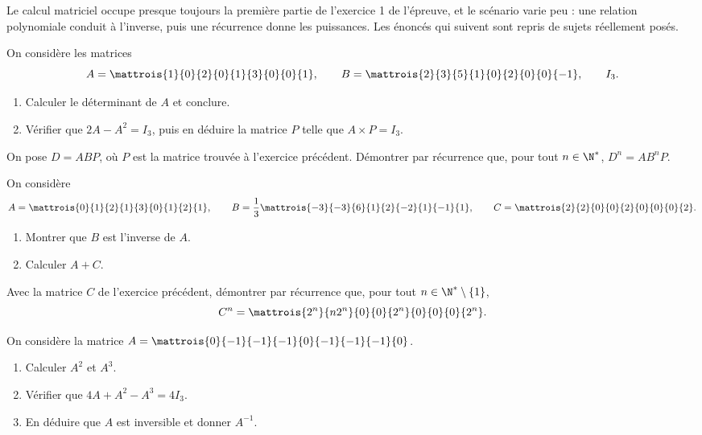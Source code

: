\begin{annales}
Le calcul matriciel occupe presque toujours la première partie de l'exercice 1
de l'épreuve, et le scénario varie peu : une relation polynomiale conduit à
l'inverse, puis une récurrence donne les puissances. Les énoncés qui suivent
sont repris de sujets réellement posés.

On considère les matrices
\[
  A = \mattrois{1}{0}{2}{0}{1}{3}{0}{0}{1}, \qquad
  B = \mattrois{2}{3}{5}{1}{0}{2}{0}{0}{-1}, \qquad I_{3}.
\]
\begin{enumerate}[label=\textbf{\arabic*)}, leftmargin=*, itemsep=0.15em]
  \item Calculer le déterminant de $A$ et conclure.
  \item Vérifier que $2A-A^{2} = I_{3}$, puis en déduire la matrice $P$ telle
        que $A \times P = I_{3}$.
\end{enumerate}

On pose $D = ABP$, où $P$ est la matrice trouvée à l'exercice précédent.
Démontrer par récurrence que, pour tout $n \in \N^{*}$,
$D^{n} = AB^{n}P$.

On considère
\[
  A = \mattrois{0}{1}{2}{1}{3}{0}{1}{2}{1}, \qquad
  B = \frac13\mattrois{-3}{-3}{6}{1}{2}{-2}{1}{-1}{1}, \qquad
  C = \mattrois{2}{2}{0}{0}{2}{0}{0}{0}{2}.
\]
\begin{enumerate}[label=\textbf{\arabic*)}, leftmargin=*, itemsep=0.15em]
  \item Montrer que $B$ est l'inverse de $A$.
  \item Calculer $A+C$.
\end{enumerate}

Avec la matrice $C$ de l'exercice précédent, démontrer par récurrence que,
pour tout $n \in \N^{*}\setminus\{1\}$,
\[
  C^{n} = \mattrois{2^{n}}{n2^{n}}{0}{0}{2^{n}}{0}{0}{0}{2^{n}}.
\]

On considère la matrice
$A = \mattrois{0}{-1}{-1}{-1}{0}{-1}{-1}{-1}{0}$.
\begin{enumerate}[label=\textbf{\arabic*)}, leftmargin=*, itemsep=0.15em]
  \item Calculer $A^{2}$ et $A^{3}$.
  \item Vérifier que $4A+A^{2}-A^{3} = 4I_{3}$.
  \item En déduire que $A$ est inversible et donner $A^{-1}$.
\end{enumerate}


\end{annales}
